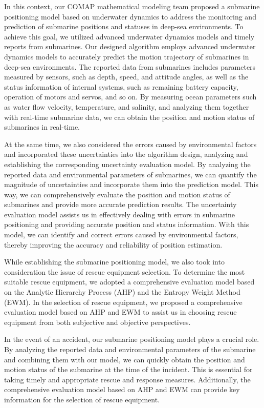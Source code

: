 \documentclass[12pt]{article}
\begin{document}
In this context, our COMAP mathematical modeling team proposed a submarine positioning model based on underwater dynamics to address the monitoring and prediction of submarine positions and statuses in deep-sea environments. To achieve this goal, we utilized advanced underwater dynamics models and timely reports from submarines. Our designed algorithm employs advanced underwater dynamics models to accurately predict the motion trajectory of submarines in deep-sea environments. The reported data from submarines includes parameters measured by sensors, such as depth, speed, and attitude angles, as well as the status information of internal systems, such as remaining battery capacity, operation of motors and servos, and so on. By measuring ocean parameters such as water flow velocity, temperature, and salinity, and analyzing them together with real-time submarine data, we can obtain the position and motion status of submarines in real-time.

At the same time, we also considered the errors caused by environmental factors and incorporated these uncertainties into the algorithm design, analyzing and establishing the corresponding uncertainty evaluation model. By analyzing the reported data and environmental parameters of submarines, we can quantify the magnitude of uncertainties and incorporate them into the prediction model. This way, we can comprehensively evaluate the position and motion status of submarines and provide more accurate prediction results. The uncertainty evaluation model assists us in effectively dealing with errors in submarine positioning and providing accurate position and status information. With this model, we can identify and correct errors caused by environmental factors, thereby improving the accuracy and reliability of position estimation.

While establishing the submarine positioning model, we also took into consideration the issue of rescue equipment selection. To determine the most suitable rescue equipment, we adopted a comprehensive evaluation model based on the Analytic Hierarchy Process (AHP) and the Entropy Weight Method (EWM). In the selection of rescue equipment, we proposed a comprehensive evaluation model based on AHP and EWM to assist us in choosing rescue equipment from both subjective and objective perspectives.

In the event of an accident, our submarine positioning model plays a crucial role. By analyzing the reported data and environmental parameters of the submarine and combining them with our model, we can quickly obtain the position and motion status of the submarine at the time of the incident. This is essential for taking timely and appropriate rescue and response measures. Additionally, the comprehensive evaluation model based on AHP and EWM can provide key information for the selection of rescue equipment.
\end{document}
